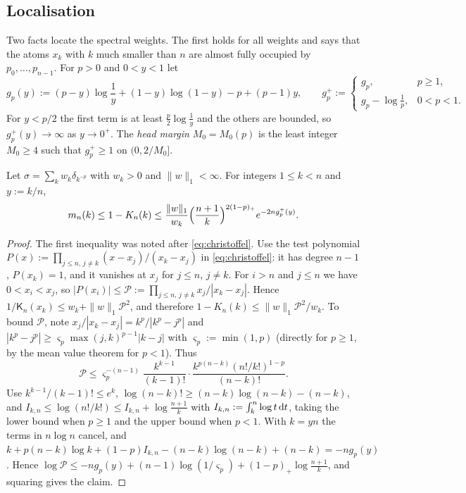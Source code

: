 \subsection{Localisation}\label{sec:loc}
Two facts locate the spectral weights. The first holds for all weights and says that the atoms $x_k$ with $k$ much
smaller than $n$ are almost fully occupied by $p_0,\dots,p_{n-1}$. For $p>0$ and $0<y<1$ let
\begin{equation}\label{eq:gp}
  g_p(y):=(p-y)\log\frac1y+(1-y)\log(1-y)-p+(p-1)y,\qquad
  g_p^+:=\begin{cases}g_p,&p\ge1,\\ g_p-\log\frac1p,&0<p<1.\end{cases}
\end{equation}
For $y<p/2$ the first term is at least $\frac p2\log\frac1y$ and the others are bounded, so $g_p^+(y)\to\infty$ as
$y\to0^+$. The \emph{head margin} $M_0=M_0(p)$ is the least integer $M_0\ge4$ such that $g_p^+\ge1$ on $(0,2/M_0]$.

\begin{lemma}\label{lem:saturation}
Let $\sigma=\sum_kw_k\delta_{k^{-p}}$ with $w_k>0$ and $\|w\|_1<\infty$. For integers $1\le k<n$ and $y:=k/n$,
\[
  m_n(k)\le1-K_n(k)\le\frac{\|w\|_1}{w_k}\Bigl(\frac{n+1}k\Bigr)^{2(1-p)_+}e^{-2ng_p^+(y)} .
\]
\end{lemma}

\begin{proof}
The first inequality was noted after \eqref{eq:christoffel}. Use the test polynomial
$P(x):=\prod_{j\le n,\,j\ne k}(x-x_j)/(x_k-x_j)$ in \eqref{eq:christoffel}: it has degree $n-1$, $P(x_k)=1$, and it
vanishes at $x_j$ for $j\le n$, $j\ne k$. For $i>n$ and $j\le n$ we have $0<x_i<x_j$, so $|P(x_i)|\le\mathcal
P:=\prod_{j\le n,\,j\ne k}x_j/|x_k-x_j|$. Hence $1/\mathsf K_n(x_k)\le w_k+\|w\|_1\mathcal P^2$, and
therefore $1-K_n(k)\le\|w\|_1\mathcal P^2/w_k$. To bound $\mathcal P$, note $x_j/|x_k-x_j|=k^p/|k^p-j^p|$ and
$|k^p-j^p|\ge\varsigma_p\max(j,k)^{p-1}|k-j|$ with $\varsigma_p:=\min(1,p)$ (directly for $p\ge1$, by the mean value
theorem for $p<1$). Thus
\[
  \mathcal P\le\varsigma_p^{-(n-1)}\frac{k^{k-1}}{(k-1)!}\cdot\frac{k^{p(n-k)}(n!/k!)^{1-p}}{(n-k)!}.
\]
Use $k^{k-1}/(k-1)!\le e^k$, $\log(n-k)!\ge(n-k)\log(n-k)-(n-k)$, and $I_{k,n}\le\log(n!/k!)\le
I_{k,n}+\log\frac{n+1}k$ with $I_{k,n}:=\int_k^n\log t\,\mathrm{d} t$, taking the lower bound when $p\ge1$ and the upper bound
when $p<1$. With $k=yn$ the terms in $n\log n$ cancel, and
$k+p(n-k)\log k+(1-p)I_{k,n}-(n-k)\log(n-k)+(n-k)=-ng_p(y)$. Hence $\log\mathcal P\le-ng_p(y)+(n-1)\log(1/\varsigma_p)
+(1-p)_+\log\frac{n+1}k$, and squaring gives the claim.
\end{proof}


